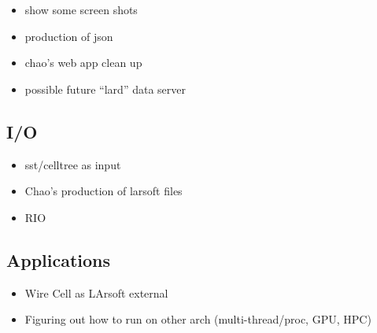 \documentclass[xcolor=dvipsnames]{beamer}
\begin{document}
\begin{frame}
  \begin{itemize}
  \item show some screen shots
  \item production of json
  \item chao's web app clean up
  \item possible future ``lard'' data server
  \end{itemize}
\end{frame}

\subsection{I/O}

\begin{frame}
  \begin{itemize}
  \item sst/celltree as input
  \item Chao's production of larsoft files
  \item RIO
  \end{itemize}
\end{frame}

\subsection{Applications}

\begin{frame}
  \begin{itemize}
  \item Wire Cell as LArsoft external
  \item Figuring out how to run on other arch (multi-thread/proc, GPU, HPC)
  \end{itemize}
\end{frame}
\end{document}
